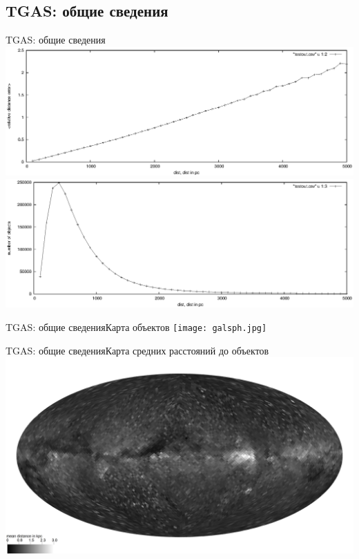 \documentclass{beamer}
\begin{document}
\subsection{TGAS: общие сведения}
\begin{frame}{TGAS: общие сведения}
\includegraphics[width=1\linewidth,height=0.4\textheight]{distvserr.eps}\\
\includegraphics[width=1\linewidth,height=0.4\textheight]{distvsN.eps}
\end{frame}

\begin{frame}{TGAS: общие сведения}{Карта объектов}
\texttt{[image: galsph.jpg]}
\end{frame}

\begin{frame}{TGAS: общие сведения}{Карта средних расстояний до объектов}
\includegraphics[width=1\linewidth]{healpdistmap.jpg}
\end{frame}
\end{document}
